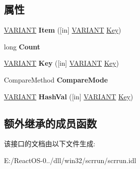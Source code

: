\subsection*{属性}
\begin{DoxyCompactItemize}
\item 
\mbox{\label{interface_scripting_1_1_i_dictionary_a4b9b6cf30022c31c5b3bfb54845d1fbf}} 
\hyperlink{structtag_v_a_r_i_a_n_t}{V\+A\+R\+I\+A\+NT} {\bfseries Item} (\mbox{[}in\mbox{]} \hyperlink{structtag_v_a_r_i_a_n_t}{V\+A\+R\+I\+A\+NT} \hyperlink{struct_key}{Key})
\item 
\mbox{\label{interface_scripting_1_1_i_dictionary_aa13ef6ae8a5e3d6500e0f92d00fb06ac}} 
long {\bfseries Count}
\item 
\mbox{\label{interface_scripting_1_1_i_dictionary_a4491d3f1d3933668c517d5032d10e931}} 
\hyperlink{structtag_v_a_r_i_a_n_t}{V\+A\+R\+I\+A\+NT} {\bfseries Key} (\mbox{[}in\mbox{]} \hyperlink{structtag_v_a_r_i_a_n_t}{V\+A\+R\+I\+A\+NT} \hyperlink{struct_key}{Key})
\item 
\mbox{\label{interface_scripting_1_1_i_dictionary_af676bd877a82918bd2887ab4429facba}} 
Compare\+Method {\bfseries Compare\+Mode}
\item 
\mbox{\label{interface_scripting_1_1_i_dictionary_a5f8bc8471b9cf154985e5334c3c382a4}} 
\hyperlink{structtag_v_a_r_i_a_n_t}{V\+A\+R\+I\+A\+NT} {\bfseries Hash\+Val} (\mbox{[}in\mbox{]} \hyperlink{structtag_v_a_r_i_a_n_t}{V\+A\+R\+I\+A\+NT} \hyperlink{struct_key}{Key})
\end{DoxyCompactItemize}
\subsection*{额外继承的成员函数}


该接口的文档由以下文件生成\+:\begin{DoxyCompactItemize}
\item 
E\+:/\+React\+O\+S-\/0../dll/win32/scrrun/scrrun.\+idl\end{DoxyCompactItemize}
